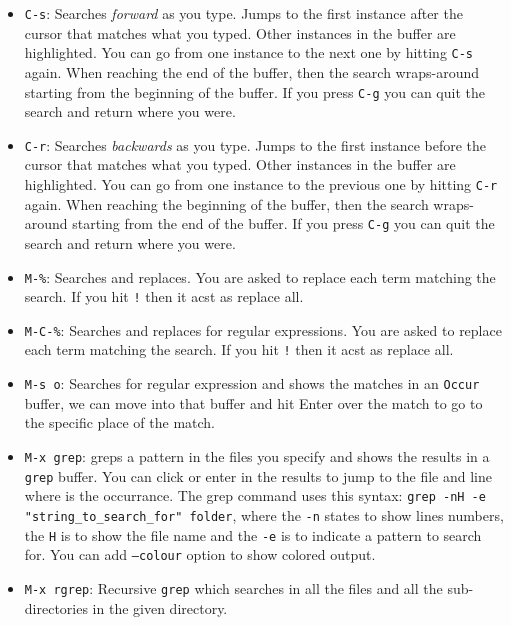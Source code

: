 \documentclass[12pt,a4paper,final]{article} %
\begin{document}
\begin{itemize}
\item \texttt{C-s}: Searches \textit{forward} as you type. Jumps to
  the first instance after the cursor that matches what you
  typed. Other instances in the buffer are highlighted. You can go
  from one instance to the next one by hitting \texttt{C-s}
  again. When reaching the end of the buffer, then the search
  wraps-around starting from the beginning of the buffer. If you press
  \texttt{C-g} you can quit the search and return where you were.
\item \texttt{C-r}: Searches \textit{backwards} as you type. Jumps to
  the first instance before the cursor that matches what you
  typed. Other instances in the buffer are highlighted. You can go
  from one instance to the previous one by hitting \texttt{C-r}
  again. When reaching the beginning of the buffer, then the search
  wraps-around starting from the end of the buffer. If you press
  \texttt{C-g} you can quit the search and return where you were.
\item \texttt{M-\%}: Searches and replaces. You are asked to replace
  each term matching the search. If you hit \texttt{!} then it acst as
  replace all.
\item \texttt{M-C-\%}: Searches and replaces for regular
  expressions. You are asked to replace each term matching the
  search. If you hit \texttt{!} then it acst as replace all.
\item \texttt{M-s o}: Searches for regular expression and shows the
  matches in an \texttt{Occur} buffer, we can move into that buffer
  and hit Enter over the match to go to the specific place of the
  match.
\item \texttt{M-x grep}: greps a pattern in the files you specify and
  shows the results in a \texttt{grep} buffer. You can click or enter
  in the results to jump to the file and line where is the
  occurrance. The grep command uses this syntax: \texttt{grep -nH -e
    "string\_to\_search\_for" folder}, where the \texttt{-n} states to
  show lines numbers, the \texttt{H} is to show the file name and the
  \texttt{-e} is to indicate a pattern to search for. You can add
  \texttt{--colour} option to show colored output.
\item \texttt{M-x rgrep}: Recursive \texttt{grep} which searches in
  all the files and all the sub-directories in the given directory.
\end{itemize}

\printbibliography[heading=bibintoc]
\end{document}
